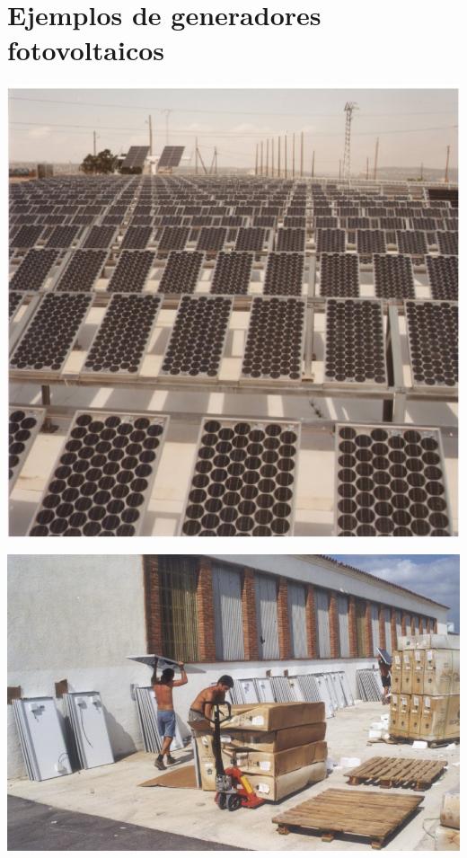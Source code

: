 \documentclass[xcolor={usenames,svgnames,dvipsnames}]{beamer}
\begin{document}
\section{Ejemplos de generadores fotovoltaicos}
\label{sec-3}

\begin{frame}[label=sec-3-0-1]{}
\includegraphics[width=.9\linewidth]{../figs/Bifacial.jpg}
\end{frame}

\begin{frame}[label=sec-3-0-2]{}
\includegraphics[width=.9\linewidth]{../figs/clasificacion2.jpg}
\end{frame}
\end{document}
